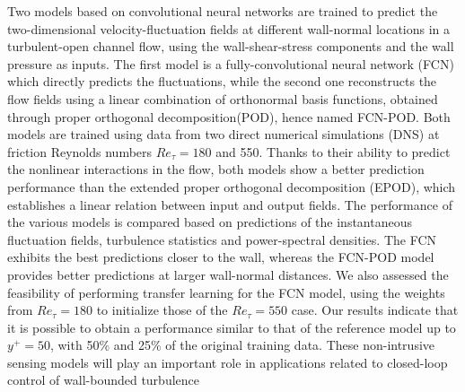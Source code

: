 \begin{paper}

\makepapertitle

%
\begin{paperabstract}
	Two models based on convolutional neural networks are trained to predict the two-dimensional velocity-fluctuation fields at different wall-normal locations in a turbulent-open channel flow, using the wall-shear-stress components and the wall pressure as inputs.
	The first model is a fully-convolutional neural network (FCN) which directly predicts the fluctuations, while the second one reconstructs the flow fields using a linear combination of orthonormal basis functions, obtained through proper orthogonal decomposition(POD), hence named FCN-POD.
	Both models are trained using data from two direct numerical simulations (DNS) at friction Reynolds numbers $Re_{\tau} = 180$ and 550.
	Thanks to their ability to predict the nonlinear interactions in the flow, both models show a better prediction  performance  than  the  extended  proper  orthogonal  decomposition  (EPOD), which establishes a linear relation between input and output fields.
	The performance of the various models is compared based on predictions of the instantaneous fluctuation fields, turbulence statistics and power-spectral densities.
	The FCN exhibits the best predictions closer to the wall, whereas the FCN-POD model provides better predictions at larger wall-normal distances.
	We also assessed the feasibility of performing transfer learning for the FCN model, using the weights from $Re_{\tau} = 180$ to initialize those of the $Re_{\tau} = 550$ case. Our results indicate that it is possible to obtain a performance similar to that of the reference model up to $y^+= 50$, with 50\% and 25\% of the original training data.
	These non-intrusive sensing models will play an important role in applications related to closed-loop control of wall-bounded turbulence
\end{paperabstract}


%



%


%


\end{paper}
